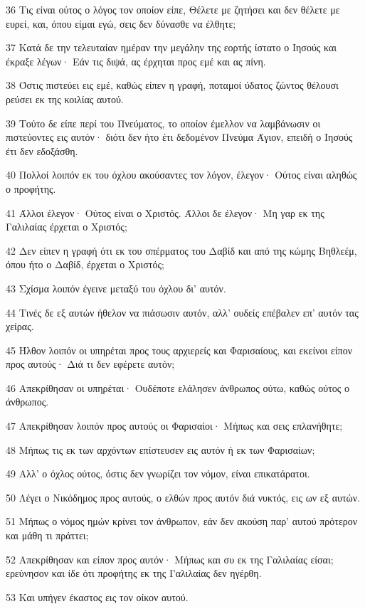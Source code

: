 \par 36 Τις είναι ούτος ο λόγος τον οποίον είπε, Θέλετε με ζητήσει και δεν θέλετε με ευρεί, και, όπου είμαι εγώ, σεις δεν δύνασθε να έλθητε;
\par 37 Κατά δε την τελευταίαν ημέραν την μεγάλην της εορτής ίστατο ο Ιησούς και έκραξε λέγων· Εάν τις διψά, ας έρχηται προς εμέ και ας πίνη.
\par 38 Όστις πιστεύει εις εμέ, καθώς είπεν η γραφή, ποταμοί ύδατος ζώντος θέλουσι ρεύσει εκ της κοιλίας αυτού.
\par 39 Τούτο δε είπε περί του Πνεύματος, το οποίον έμελλον να λαμβάνωσιν οι πιστεύοντες εις αυτόν· διότι δεν ήτο έτι δεδομένον Πνεύμα Άγιον, επειδή ο Ιησούς έτι δεν εδοξάσθη.
\par 40 Πολλοί λοιπόν εκ του όχλου ακούσαντες τον λόγον, έλεγον· Ούτος είναι αληθώς ο προφήτης.
\par 41 Άλλοι έλεγον· Ούτος είναι ο Χριστός. Άλλοι δε έλεγον· Μη γαρ εκ της Γαλιλαίας έρχεται ο Χριστός;
\par 42 Δεν είπεν η γραφή ότι εκ του σπέρματος του Δαβίδ και από της κώμης Βηθλεέμ, όπου ήτο ο Δαβίδ, έρχεται ο Χριστός;
\par 43 Σχίσμα λοιπόν έγεινε μεταξύ του όχλου δι' αυτόν.
\par 44 Τινές δε εξ αυτών ήθελον να πιάσωσιν αυτόν, αλλ' ουδείς επέβαλεν επ' αυτόν τας χείρας.
\par 45 Ήλθον λοιπόν οι υπηρέται προς τους αρχιερείς και Φαρισαίους, και εκείνοι είπον προς αυτούς· Διά τι δεν εφέρετε αυτόν;
\par 46 Απεκρίθησαν οι υπηρέται· Ουδέποτε ελάλησεν άνθρωπος ούτω, καθώς ούτος ο άνθρωπος.
\par 47 Απεκρίθησαν λοιπόν προς αυτούς οι Φαρισαίοι· Μήπως και σεις επλανήθητε;
\par 48 Μήπως τις εκ των αρχόντων επίστευσεν εις αυτόν ή εκ των Φαρισαίων;
\par 49 Αλλ' ο όχλος ούτος, όστις δεν γνωρίζει τον νόμον, είναι επικατάρατοι.
\par 50 Λέγει ο Νικόδημος προς αυτούς, ο ελθών προς αυτόν διά νυκτός, εις ων εξ αυτών.
\par 51 Μήπως ο νόμος ημών κρίνει τον άνθρωπον, εάν δεν ακούση παρ' αυτού πρότερον και μάθη τι πράττει;
\par 52 Απεκρίθησαν και είπον προς αυτόν· Μήπως και συ εκ της Γαλιλαίας είσαι; ερεύνησον και ίδε ότι προφήτης εκ της Γαλιλαίας δεν ηγέρθη.
\par 53 Και υπήγεν έκαστος εις τον οίκον αυτού.


